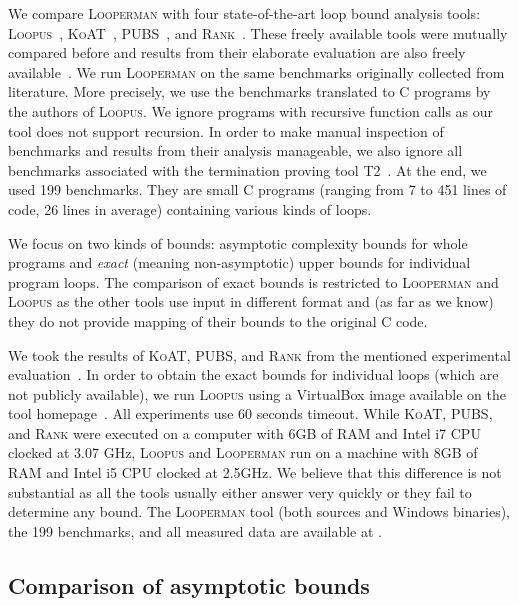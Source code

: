 \documentclass[10pt,a4paper]{article}
\newcommand{\Looperman}{\textsc{Looperman}\xspace}
\newcommand{\Loopus}{\textsc{Loopus}\xspace}
\newcommand{\KoAT}{\textsc{KoAT}\xspace}
\newcommand{\PUBS}{\textsc{PUBS}\xspace}
\newcommand{\Rank}{\textsc{Rank}\xspace}
\begin{document}
We compare \Looperman with four state-of-the-art loop bound analysis
tools: \Loopus~\cite{Loopus2014}, \KoAT~\cite{KoAT2014},
\PUBS~\cite{PUBS2008}, and \Rank~\cite{Rank2010}.  These freely
available tools were mutually compared before and results from their
elaborate evaluation are also freely
available~\cite{KoAT_EvalData,Loopus_EvalData}. We run \Looperman on
the same benchmarks originally collected from literature.  More
precisely, we use the benchmarks
translated to C programs by the authors of \Loopus. We ignore programs
with recursive function calls as our tool does not support recursion.
In order to make manual inspection of benchmarks and results from
their analysis manageable, we also ignore all benchmarks associated
with the termination proving tool \textsc{T2}~\cite{T2}. At the end,
we used 199 benchmarks. They are small C programs (ranging from 7 to
451 lines of code, 26 lines in average) containing various kinds of
loops.



We focus on two kinds of bounds: asymptotic complexity bounds for
whole programs and \emph{exact} (meaning non-asymptotic) upper bounds
for individual program loops. The comparison of exact bounds is
restricted to \Looperman and \Loopus as the other tools use input in
different format and (as far as we know) they do not provide mapping
of their bounds to the original C code.

We took the results of \KoAT, \PUBS, and \Rank from the mentioned
experimental evaluation~\cite{KoAT_EvalData}.  In order to obtain the
exact bounds for individual loops (which are not publicly available),
we run \Loopus using a VirtualBox image available on the tool
homepage~\cite{LoopusWeb}. All experiments use 60 seconds
timeout. While \KoAT, \PUBS, and \Rank were executed on a computer
with 6GB of RAM and Intel i7 CPU clocked at 3.07 GHz, \Loopus and
\Looperman run on a machine with 8GB of RAM and Intel i5 CPU clocked
at 2.5GHz. We believe that this difference is not substantial as all
the tools usually either answer very quickly or they fail to determine
any bound. The \Looperman tool (both sources and Windows binaries),
the 199 benchmarks, and all measured data are available at \cite{EVALDATA}.



\subsection{Comparison of asymptotic bounds}\label{sec:evalAsympt}
\end{document}
